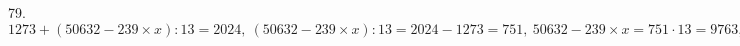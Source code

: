 79. $1273+(50632-239\times x):13=2024,\ (50632-239\times x):13=2024-1273=751,\ 50632-239\times x=751\cdot13=9763,\ 239\times x=50632-9763=40869,\ x=40869:239=171.$\\
